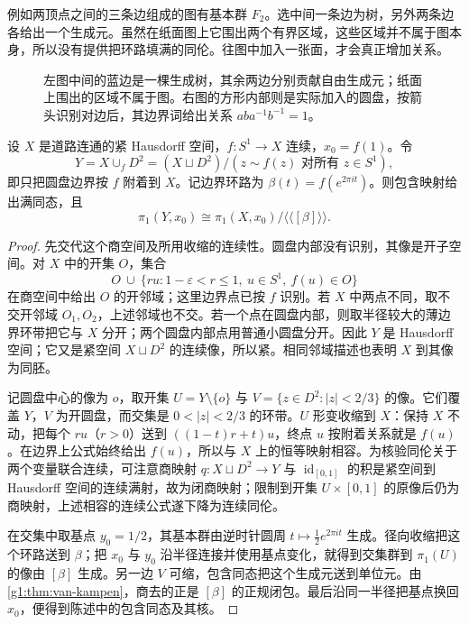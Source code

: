 例如两顶点之间的三条边组成的图有基本群 \(F_2\)。选中间一条边为树，另外两条边各给出一个生成元。虽然在纸面图上它围出两个有界区域，这些区域并不属于图本身，所以没有提供把环路填满的同伦。往图中加入一张面，才会真正增加关系。

\begin{figure}[htbp]
	\centering
	
	\caption[图的生成元与附着面的关系]{左图中间的蓝边是一棵生成树，其余两边分别贡献自由生成元；纸面上围出的区域不属于图。右图的方形内部则是实际加入的圆盘，按箭头识别对边后，其边界词给出关系 \(aba^{-1}b^{-1}=1\)。}
	\label{g1:fig:graph-and-cell}
\end{figure}

\begin{proposition}\label{g1:prop:attach-disk}
	设 \(X\) 是道路连通的紧 Hausdorff 空间，\(f:S^1\to X\) 连续，\(x_0=f(1)\)。令
	\[
		Y=X\cup_fD^2=(X\sqcup D^2)/(z\sim f(z)\text{ 对所有 }z\in S^1),
	\]
	即只把圆盘边界按 \(f\) 附着到 \(X\)。记边界环路为 \(\beta(t)=f(e^{2\pi it})\)。则包含映射给出满同态，且
	\[
		\pi_1(Y,x_0)\cong\pi_1(X,x_0)/\langle\!\langle[\beta]\rangle\!\rangle.
	\]
\end{proposition}
\begin{proof}
	先交代这个商空间及所用收缩的连续性。圆盘内部没有识别，其像是开子空间。对 \(X\) 中的开集 \(O\)，集合
	\[
		O\ \cup\ \{ru:1-\varepsilon<r\le1,\ u\in S^1,\ f(u)\in O\}
	\]
	在商空间中给出 \(O\) 的开邻域；这里边界点已按 \(f\) 识别。若 \(X\) 中两点不同，取不交开邻域 \(O_1,O_2\)，上述邻域也不交。若一个点在圆盘内部，则取半径较大的薄边界环带把它与 \(X\) 分开；两个圆盘内部点用普通小圆盘分开。因此 \(Y\) 是 Hausdorff 空间；它又是紧空间 \(X\sqcup D^2\) 的连续像，所以紧。相同邻域描述也表明 \(X\) 到其像为同胚。

	记圆盘中心的像为 \(o\)，取开集 \(U=Y\setminus\{o\}\) 与 \(V=\{z\in D^2:|z|<2/3\}\) 的像。它们覆盖 \(Y\)，\(V\) 为开圆盘，而交集是 \(0<|z|<2/3\) 的环带。\(U\) 形变收缩到 \(X\)：保持 \(X\) 不动，把每个 \(ru\)（\(r>0\)）送到 \(((1-t)r+t)u\)，终点 \(u\) 按附着关系就是 \(f(u)\)。在边界上公式始终给出 \(f(u)\)，所以与 \(X\) 上的恒等映射相容。为核验同伦关于两个变量联合连续，可注意商映射 \(q:X\sqcup D^2\to Y\) 与 \(\operatorname{id}_{[0,1]}\) 的积是紧空间到 Hausdorff 空间的连续满射，故为闭商映射；限制到开集 \(U\times[0,1]\) 的原像后仍为商映射，上述相容的连续公式遂下降为连续同伦。

	在交集中取基点 \(y_0=1/2\)，其基本群由逆时针圆周 \(t\mapsto\tfrac12e^{2\pi it}\) 生成。径向收缩把这个环路送到 \(\beta\)；把 \(x_0\) 与 \(y_0\) 沿半径连接并使用基点变化，就得到交集群到 \(\pi_1(U)\) 的像由 \([\beta]\) 生成。另一边 \(V\) 可缩，包含同态把这个生成元送到单位元。由\cref{g1:thm:van-kampen}，商去的正是 \([\beta]\) 的正规闭包。最后沿同一半径把基点换回 \(x_0\)，便得到陈述中的包含同态及其核。
\end{proof}

